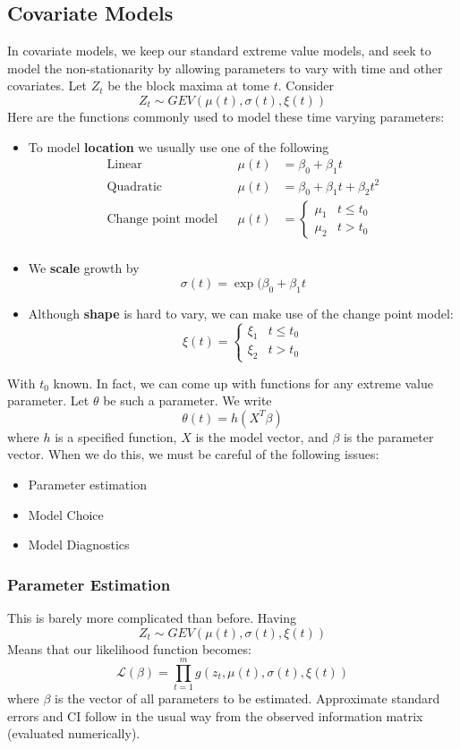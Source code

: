 \documentclass{article}
\theoremstyle{definition}
\theoremstyle{definition}
\begin{document}
\subsection{Covariate Models}
In covariate models, we keep our standard extreme value models, and seek to model the non-stationarity by
allowing parameters to vary with time and other
covariates. Let $Z_t$ be the block maxima at tome $t$. Consider
\[Z_t \sim GEV(\mu(t), \sigma(t), \xi(t))\]
Here are the functions commonly used to model these time varying parameters:
\begin{itemize}
    \item To model \textbf{location} we usually use one of the following
    \begin{align*}
        \text{Linear} &&\mu(t)&=\beta_0+\beta_1t \\
        \text{Quadratic} && \mu(t)&=\beta_0+\beta_1t+\beta_2t^2\\
        \text{Change point model} &&\mu(t)&=\begin{cases}\mu_1 & t\leq t_0\\ \mu_2 & t> t_0
        \end{cases}\\
    \end{align*}
    \item We \textbf{scale} growth by
    \[\sigma(t)= \exp(\beta_0+\beta_1t\]
    \item Although \textbf{shape} is hard to vary, we can make use of the change point model:
    \[\xi(t)=\begin{cases}\xi_1 & t\leq t_0\\ \xi_2 & t> t_0\end{cases}\]
\end{itemize}
With $t_0$ known. In fact, we can come up with functions for any extreme value parameter. Let $\theta$ be such a parameter. We write
\[\theta(t)= h(X^T\beta)\]
where $h$ is a specified function, $X$ is the model vector, and $\beta $ is the parameter vector. When we do this, we must be careful of the following issues:
\begin{itemize}
    \item Parameter estimation
    \item Model Choice
    \item Model Diagnostics
\end{itemize}
\subsubsection{Parameter Estimation}
This is barely more complicated than before. Having 
\[Z_t \sim GEV(\mu(t), \sigma(t), \xi(t))\]
Means that our likelihood function becomes:
\[\mathcal{L}(\beta)= \prod_{t=1}^{m} g(z_t, \mu(t), \sigma(t), \xi(t))\]
where $\beta$ is the vector of all parameters to be
estimated. Approximate standard errors and CI
follow in the usual way from the observed information matrix (evaluated numerically).
\end{document}
